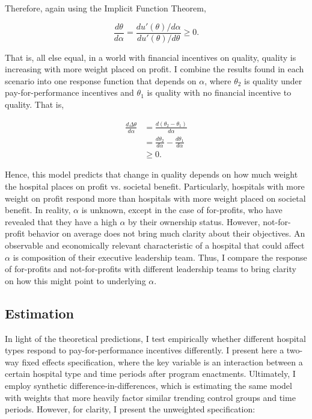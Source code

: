 \documentclass[12pt]{article}
\begin{document}
    Therefore, again using the Implicit Function Theorem,

    $$\frac{d\theta}{d\alpha} = \frac{du'(\theta)/d\alpha}{du'(\theta)/d\theta}\geq0.$$

    That is, all else equal, in a world with financial incentives on quality, quality is increasing with more weight placed on profit. I combine the results found in each scenario into one response function that depends on $\alpha$, where $\theta_2$ is quality under pay-for-performance incentives and $\theta_1$ is quality with no financial incentive to quality. That is, 

    \begin{align*}
        \frac{d\Delta\theta}{d\alpha}&=\frac{d(\theta_2-\theta_1)}{d\alpha}\\
        &=\frac{d\theta_2}{d\alpha}-\frac{d\theta_1}{d\alpha}\\
        &\geq 0.
    \end{align*}


    Hence, this model predicts that change in quality depends on how much weight the hospital places on profit vs. societal benefit. Particularly, hospitals with more weight on profit respond more than hospitals with more weight placed on societal benefit. In reality, $\alpha$ is unknown, except in the case of for-profits, who have revealed that they have a high $\alpha$ by their ownership status. However, not-for-profit behavior on average does not bring much clarity about their objectives. An observable and economically relevant characteristic of a hospital that could affect $\alpha$ is composition of their executive leadership team. Thus, I compare the response of for-profits and not-for-profits with different leadership teams to bring clarity on how this might point to underlying $\alpha$.
    

    \subsection{Estimation}

    In light of the theoretical predictions, I test empirically whether different hospital types respond to pay-for-performance incentives differently. I present here a two-way fixed effects specification, where the key variable is an interaction between a certain hospital type and time periods after program enactments. Ultimately, I employ synthetic difference-in-differences, which is estimating the same model with weights that more heavily factor similar trending control groups and time periods. However, for clarity, I present the unweighted specification:
\end{document}
